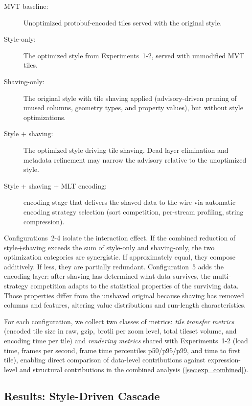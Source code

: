 \begin{description}
    \item[\ac{MVT} baseline:] Unoptimized protobuf-encoded tiles served with the original style.
    \item[Style-only:] The optimized style from Experiments~1-2, served with unmodified \ac{MVT} tiles.
    \item[Shaving-only:] The original style with tile shaving applied (advisory-driven pruning of unused columns, geometry types, and property values), but without style optimizations.
    \item[Style + shaving:] The optimized style driving tile shaving.
    Dead layer elimination and metadata refinement may narrow the advisory relative to the unoptimized style.
    \item[Style + shaving + \ac{MLT} encoding:] encoding stage that delivers the shaved data to the wire via automatic encoding strategy selection (sort competition, per-stream profiling, string compression).
\end{description}

\noindent Configurations~2-4 isolate the interaction effect.
If the combined reduction of style+shaving exceeds the sum of style-only and shaving-only, the two optimization categories are synergistic.
If approximately equal, they compose additively.
If less, they are partially redundant.
Configuration~5 adds the encoding layer: after shaving has determined what data survives, the multi-strategy competition adapts to the statistical properties of the surviving data.
Those properties differ from the unshaved original because shaving has removed columns and features, altering value distributions and run-length characteristics.

For each configuration, we collect two classes of metrics: \emph{tile transfer metrics} (encoded tile size in raw, gzip, brotli per zoom level, total tileset volume, and encoding time per tile) and \emph{rendering metrics} shared with Experiments~1-2 (load time, frames per second, frame time percentiles p50/p95/p99, and time to first tile), enabling direct comparison of data-level contributions against expression-level and structural contributions in the combined analysis (\cref{sec:exp_combined}).

\subsection{Results: Style-Driven Cascade}\label{sub:mlt_results}

